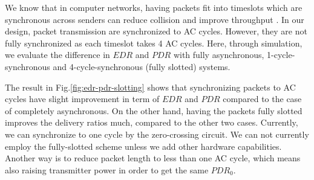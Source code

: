 We know that in computer networks, having packets fit into timeslots which are synchronous across senders can reduce collision and improve throughput \cite{Roberts1975}. In our design, packet transmission are synchronized to AC cycles. However, they are not fully synchronized as each timeslot takes 4 AC cycles. Here, through simulation, we evaluate the difference in $EDR$ and $PDR$ with fully asynchronous, 1-cycle-synchronous and 4-cycle-synchronous (fully slotted) systems. 

The result in Fig.\ref{fig:edr-pdr-slotting} shows that synchronizing packets to AC cycles have slight improvement in term of $EDR$ and $PDR$ compared to the case of completely asynchronous. On the other hand, having the packets fully slotted improves the delivery ratios much, compared to the other two cases. Currently, we can synchronize to one cycle by the zero-crossing circuit. We can not currently employ the fully-slotted scheme unless we add other hardware capabilities. Another way is to reduce packet length to less than one AC cycle, which means also raising transmitter power in order to get the same $PDR_0$. 

